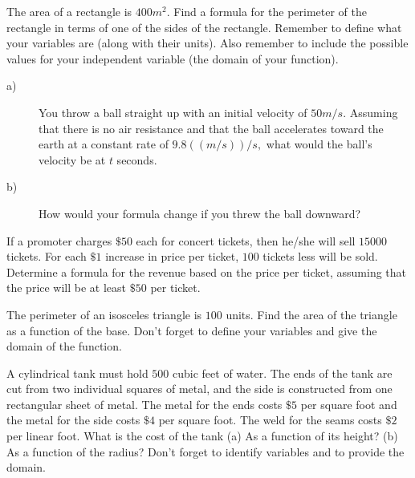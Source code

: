 \begin{ProblemSection}
  \begin{embeddedproblem}{}
    The area of a rectangle is $400 m^2.$  Find a formula for the
    perimeter of the rectangle in terms of one of the sides of the
    rectangle.  Remember to define what your variables are (along with
    their units).  Also remember to include the possible values for
    your independent variable (the domain of your function).
  \end{embeddedproblem}
  \begin{embeddedproblem}{}
    \begin{description}
    \item[a)] You throw a ball straight up with an initial velocity of
      $50 m/s.$ Assuming that there is no air resistance and that the
      ball accelerates toward the earth at a constant rate of
      $9.8 ((m/s))/s,$ what would the ball's velocity be at $t$
      seconds.
   \item[b)] How would your formula change if you threw the ball
     downward?
    \end{description}
  \end{embeddedproblem}
  \begin{embeddedproblem}{}
    If a promoter charges $\$50$ each for concert tickets, then he/she
    will sell $15000$ tickets.  For each $\$1$ increase in price per
    ticket, $100$ tickets less will be sold.  Determine a formula for
    the revenue based on the price per ticket, assuming that the price
    will be at least $\$50$ per ticket.
  \end{embeddedproblem}
  \begin{embeddedproblem}{}
    The perimeter of an isosceles triangle is $100$ units.  Find the
    area of the triangle as a function of the base.  Don't forget to
    define your variables and give the domain of the function.
  \end{embeddedproblem}
  \begin{embeddedproblem}{}
    A cylindrical tank must hold $500$ cubic feet of water.  The ends of
    the tank are cut from two individual squares of metal, and the
    side is constructed from one rectangular sheet of metal.  The
    metal for the ends costs $\$5$ per square foot and the metal for the
    side costs $\$4$ per square foot.  The weld for the seams costs $\$2$
    per linear foot.  What is the cost of the tank (a) As a function of
    its height?  (b)  As a function of the radius?  Don't forget
    to identify variables and to provide the domain.

\end{embeddedproblem}
\end{ProblemSection}
